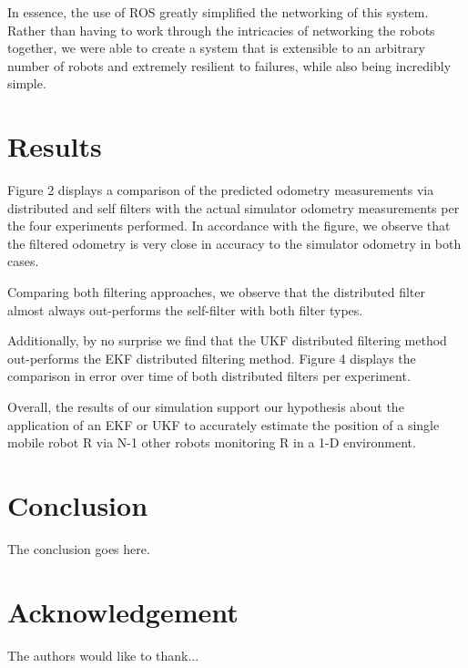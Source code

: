\documentclass[conference]{IEEEtran} \usepackage[T1]{fontenc} \usepackage[backend=biber, style=ieee]{biblatex}
\begin{document}
In essence, the use of ROS greatly simplified the networking of this system. Rather than having to work through the
intricacies of networking the robots together, we were able to create a system that is extensible to an arbitrary number
of robots and extremely resilient to failures, while also being incredibly simple.

\section{Results} \label{Results} %
Figure 2 displays a comparison of the predicted odometry measurements via distributed and self filters with the actual
simulator odometry measurements per the four experiments performed. In accordance with the figure, we observe that the
filtered odometry is very close in accuracy to the simulator odometry in both cases.

 Comparing both filtering approaches, we observe that the distributed filter almost always out-performs the self-filter
 with both filter types.

Additionally, by no surprise we find that the UKF distributed filtering method out-performs the EKF distributed
filtering method. Figure 4 displays the comparison in error over time of both distributed filters per experiment.

Overall, the results of our simulation support our hypothesis about the application of an EKF or UKF to accurately
estimate the position of a single mobile robot R via N-1 other robots monitoring R in a 1-D environment.

\section{Conclusion} \label{Conclusion} 
The conclusion goes here.

\section*{Acknowledgement}

The authors would like to thank...

\printbibliography
\end{document}
